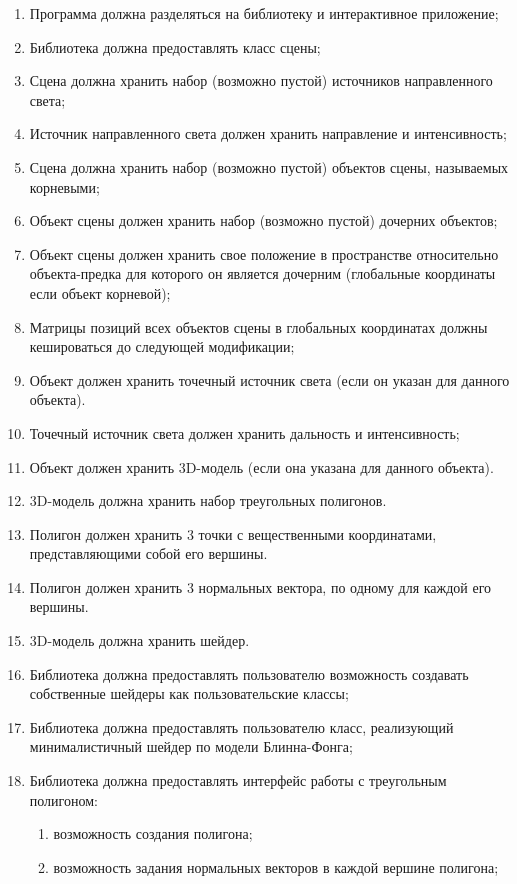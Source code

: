 \begin{enumerate}
    \item Программа должна разделяться на библиотеку и интерактивное приложение;
    \item Библиотека должна предоставлять класс сцены;
    \item Сцена должна хранить набор (возможно пустой) источников направленного света;
    \item Источник направленного света должен хранить направление и интенсивность;
    \item Сцена должна хранить набор (возможно пустой) объектов сцены, называемых корневыми;
    \item Объект сцены должен хранить набор (возможно пустой) дочерних объектов;
    \item Объект сцены должен хранить свое положение в пространстве относительно объекта-предка для которого он является дочерним (глобальные координаты если объект корневой);
    \item Матрицы позиций всех объектов сцены в глобальных координатах должны кешироваться до следующей модификации;
    \item Объект должен хранить точечный источник света (если он указан для данного объекта).
    \item Точечный источник света должен хранить дальность и интенсивность;
    \item Объект должен хранить 3D-модель (если она указана для данного объекта).
    \item 3D-модель должна хранить набор треугольных полигонов.
    \item Полигон должен хранить 3 точки с вещественными координатами, представляющими собой его вершины.
    \item Полигон должен хранить 3 нормальных вектора, по одному для каждой его вершины.
    \item 3D-модель должна хранить шейдер.
    \item Библиотека должна предоставлять пользователю возможность создавать собственные шейдеры как пользовательские классы;
    \item Библиотека должна предоставлять пользователю класс, реализующий минималистичный шейдер по модели Блинна-Фонга;
    \item Библиотека должна предоставлять интерфейс работы с треугольным полигоном:
    \begin{enumerate}
        \item возможность создания полигона;
        \item возможность задания нормальных векторов в каждой вершине полигона;

\end{enumerate}
\end{enumerate}
